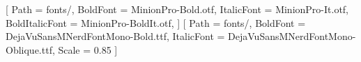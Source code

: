 \setlength{\parindent}{0pt}
  


\setmainfont{MinionPro-Regular.otf}[
  Path = fonts/,
  BoldFont = MinionPro-Bold.otf,
  ItalicFont = MinionPro-It.otf,
  BoldItalicFont = MinionPro-BoldIt.otf,
]
\setmonofont{DejaVuSansMNerdFontMono-Regular.ttf}[
  Path = fonts/,
  BoldFont = DejaVuSansMNerdFontMono-Bold.ttf,
  ItalicFont = DejaVuSansMNerdFontMono-Oblique.ttf,
  Scale = 0.85
]


\fancyhead[LO]{\leftmark}
\fancyhead[RO]{\thepage}
\fancyhead[RE]{\rightmark}
\fancyhead[LE]{\thepage}
\fancyfoot{}

\makeatletter
\def\FV@DefineFindStop{%
  \ifx\FancyVerbStopString\relax
    \ifnum\FancyVerbStopNum<\@ne
      \let\FV@FindStartStop\FV@@PreProcessLine
    \else
      \let\FV@FindStartStop\FV@FindStopNum
    \fi
  \else
    \let\FV@FindStartStop\FV@FindStopString
  \fi}
\makeatother